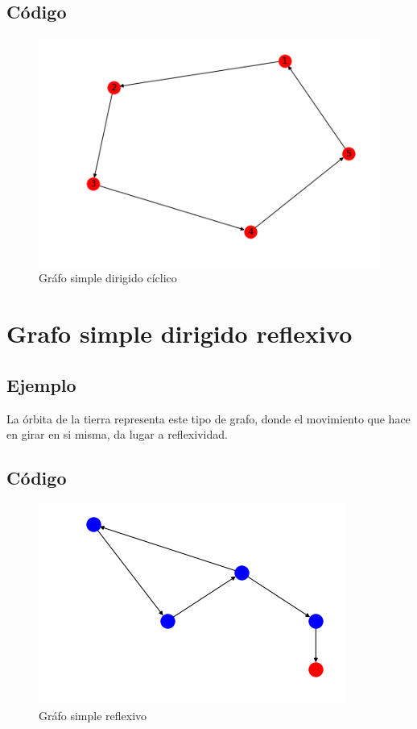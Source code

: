 \documentclass[10pt,a4paper]{article}
\begin{document}
\subsection{Código}
\begin{figure}[H]
\centering
\includegraphics[scale=.5]{grafosimpledirigidociclico}
\caption{Gráfo simple  dirigido cíclico}
\end{figure}

\section{Grafo simple dirigido reflexivo}
\subsection{Ejemplo} La órbita de la tierra representa este tipo de grafo, donde el movimiento que hace en girar en si misma, da lugar a reflexividad. 
\subsection{Código}
\begin{figure}[H]
\centering
\includegraphics[scale=.5]{grafosimpledirigidoreflexivo}
\caption{Gráfo simple  reflexivo}
\end{figure}
\end{document}
